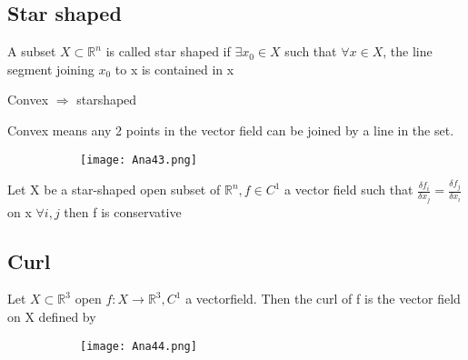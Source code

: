 \documentclass[8pt]{extreport}
\newcommand{\R}{\mathbb{R}}
\begin{document}
\subsection{Star shaped}

A subset $X \subset \R^n$ is called star shaped if $\exists x_0 \in X$ such that $\forall x \in X$, the line segment joining $x_0$ to x is contained in x\\
\begin{center}
Convex $\Rightarrow$ starshaped
\end{center}
Convex means any 2 points in the vector field can be joined by a line in the set.
\begin{figure}[H]
\centering
\begin{subfigure}[b]{0.4\linewidth}
\texttt{[image: Ana43.png]}
\end{subfigure}
\end{figure}
Let X be a star-shaped open subset of $\R^n, f \in C^1$ a vector field such that
$\frac{\delta f_i}{\delta x_j} = \frac{\delta f_j}{\delta x_i}$ on x $\forall i,j$ then f is conservative


\subsection{Curl}

Let $ X \subset \R^3$ open $f:X \to \R^3, C^1$ a vectorfield. Then the curl of f is the vector field on X defined by 
\begin{figure}[H]
\centering
\begin{subfigure}[b]{0.4\linewidth}
\texttt{[image: Ana44.png]}
\end{subfigure}
\end{figure}
\end{document}
